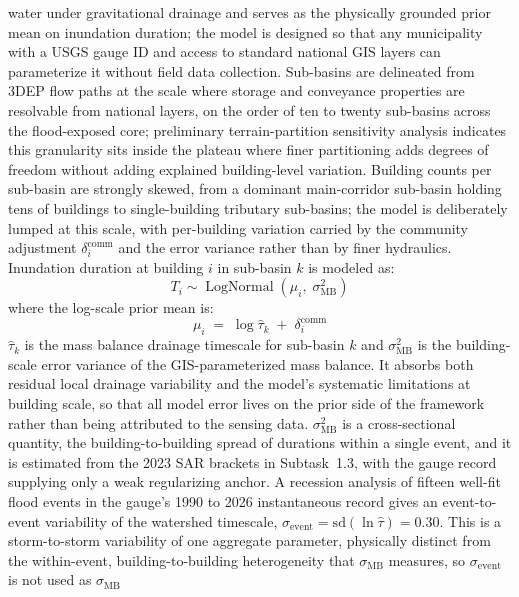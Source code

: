\documentclass[11pt]{article}
\begin{document}
water under gravitational drainage and serves as the physically grounded prior mean
on inundation duration; the model is designed so that any municipality with a USGS
gauge ID and access to standard national GIS layers can parameterize it without
field data collection.
Sub-basins are delineated from 3DEP flow paths at the scale where storage and
conveyance properties are resolvable from national layers, on the order of ten to
twenty sub-basins across the flood-exposed core; preliminary terrain-partition
sensitivity analysis indicates this granularity sits
inside the plateau where finer partitioning adds degrees of freedom without
adding explained building-level variation.
Building counts per sub-basin are strongly skewed, from a dominant main-corridor sub-basin holding tens of buildings to single-building tributary sub-basins; the model is deliberately lumped at this scale, with per-building variation carried by the community adjustment $\delta_i^{\mathrm{comm}}$ and the error variance rather than by finer hydraulics.
Inundation duration at building $i$ in sub-basin $k$ is modeled as:
\begin{equation}\label{eq:prior}
  T_i \sim \operatorname{LogNormal}(\mu_i,\; \sigma_{\mathrm{MB}}^2)
\end{equation}
where the log-scale prior mean is:
\begin{equation}\label{eq:mu}
  \mu_i \;=\; \log \hat{\tau}_k \;+\; \delta_i^{\mathrm{comm}}
\end{equation}
$\hat{\tau}_k$ is the mass balance drainage timescale for sub-basin $k$ and
$\sigma_{\mathrm{MB}}^2$ is the building-scale error variance of the
GIS-parameterized mass balance. It absorbs both residual local drainage
variability and the model's systematic limitations at building scale, so that
all model error lives on the prior side of the framework rather than being
attributed to the sensing data.
$\sigma_{\mathrm{MB}}^2$ is a cross-sectional quantity, the building-to-building
spread of durations within a single event, and it is estimated from the 2023 SAR
brackets in Subtask~1.3, with the gauge record supplying only a weak regularizing
anchor. A recession analysis of fifteen well-fit flood events in the gauge's
1990 to 2026 instantaneous record gives an
event-to-event variability of the watershed timescale,
$\sigma_{\mathrm{event}} = \mathrm{sd}(\ln \hat{\tau}) = 0.30$. This is a
storm-to-storm variability of one aggregate parameter, physically distinct from
the within-event, building-to-building heterogeneity that $\sigma_{\mathrm{MB}}$
measures, so $\sigma_{\mathrm{event}}$ is not used as $\sigma_{\mathrm{MB}}$
\end{document}

